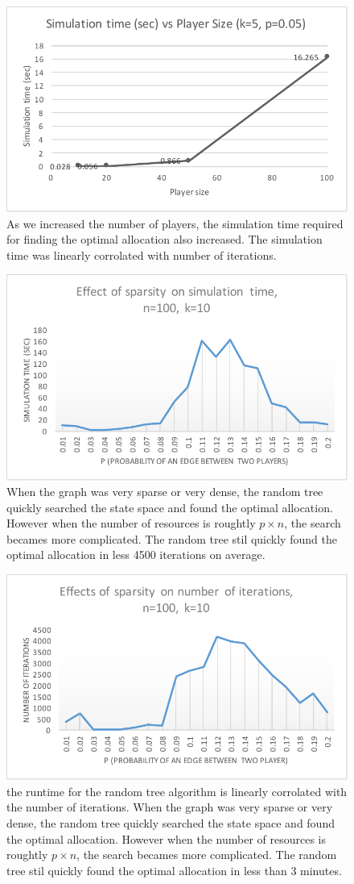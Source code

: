 \begin{figure}[htb]
\begin{center}
\includegraphics[width=.4\textwidth]{result-2}
\end{center}
\caption{As we increased the number of players, the simulation time required for finding the optimal allocation also increased. The simulation time was linearly corrolated with number of iterations.}
\label{fig:result2}
\end{figure}

\begin{figure}[htb]
\begin{center}
\includegraphics[width=.4\textwidth]{result-3}
\end{center}
\caption{When the graph was very sparse or very dense, the random tree quickly searched the state space and found the optimal allocation. However when the number of resources is roughtly $p\times n$, the search becames more complicated. The random tree stil quickly found the optimal allocation in less 4500 iterations on average. }
\label{fig:result3}
\end{figure}

\begin{figure}[htb]
\begin{center}
\includegraphics[width=.4\textwidth]{result-4}
\end{center}
\caption{the runtime for the random tree algorithm is linearly corrolated with the number of iterations. When the graph was very sparse or very dense, the random tree quickly searched the state space and found the optimal allocation. However when the number of resources is roughtly $p\times n$, the search becames more complicated. The random tree stil quickly found the optimal allocation in less than 3 minutes.}
\label{fig:result4}
\end{figure}
